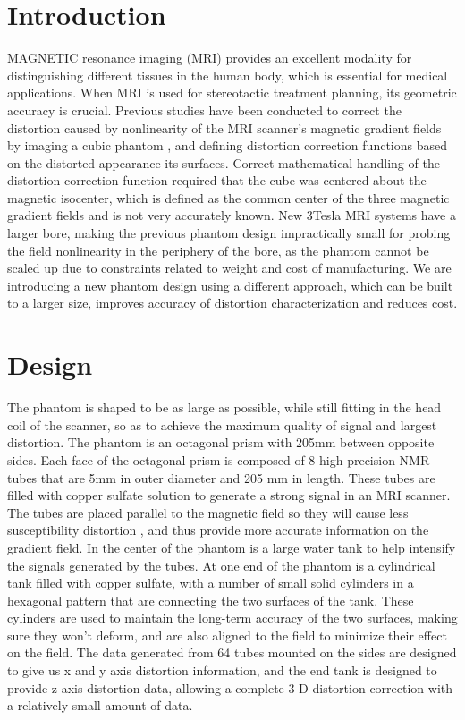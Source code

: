 \section{Introduction}

MAGNETIC resonance imaging (MRI) provides an excellent modality for distinguishing different tissues in the 
human body, which is essential for medical applications. When MRI is used for stereotactic treatment planning,
its geometric accuracy is crucial. Previous studies have been conducted to correct the distortion caused by 
nonlinearity of the MRI scanner’s magnetic gradient fields by imaging a cubic phantom \cite{simple_approach},
\cite{tlee_iaeng} and defining 
distortion correction functions based on the distorted appearance its surfaces. Correct mathematical handling 
of the distortion correction function required that the cube was centered about the magnetic isocenter, which 
is defined as the common center of the three magnetic gradient fields and  is not very accurately known.  
New 3Tesla MRI systems have a larger bore, making the previous phantom design impractically small for probing 
the field nonlinearity in the periphery of the bore, as the phantom cannot be scaled up due to constraints 
related to weight and cost of manufacturing. We are introducing a new phantom design using a different 
approach, which can be built to a larger size, improves accuracy of distortion characterization and reduces 
cost.

\section{Design}

The phantom is shaped to be as large as possible, while still fitting in the head coil of the scanner, so as 
to achieve the maximum quality of signal and largest distortion. The phantom is an octagonal prism with 205mm 
between opposite sides.  Each face of the octagonal prism is composed of 8 high precision NMR tubes that are 
5mm in outer diameter and 205 mm in length. These tubes are filled with copper sulfate solution to generate a 
strong signal in an MRI scanner.  The tubes are placed parallel to the magnetic field so they will cause less 
susceptibility distortion \cite{mag_susceptibility}, 
and thus provide more accurate information on the gradient field.  In the 
center of the phantom is a large water tank to help intensify the signals generated by the tubes. At one end 
of the phantom is a cylindrical tank filled with copper sulfate, with a number of small solid cylinders in a 
hexagonal pattern that are connecting the two surfaces of the tank. These cylinders are used to maintain the 
long-term accuracy of the two surfaces, making sure they won’t deform, and are also aligned to the field to 
minimize their effect on the field.  The data generated from 64 tubes mounted on the sides are designed to 
give us x and y axis distortion information, and the end tank is designed to provide z-axis distortion data, 
allowing a complete 3-D distortion correction with a relatively small amount of data. 


